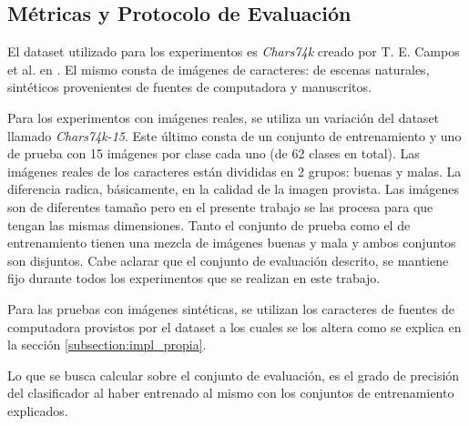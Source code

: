 \subsection{Métricas y Protocolo de Evaluación}
\label{subsection:evaluacion}


	El dataset utilizado para los experimentos es \textit{Chars74k} creado por T. E. Campos et al. en \cite{dCBV09}. El mismo consta de imágenes de caracteres: de escenas naturales, sintéticos provenientes de fuentes de computadora y manuscritos.
	
	Para los experimentos con imágenes reales, se utiliza un variación del dataset llamado \textit{Chars74k-15}. Este último consta de un conjunto de entrenamiento y uno de prueba con 15 imágenes por clase cada uno (de 62 clases en total). Las imágenes reales de los caracteres están divididas en 2 grupos: buenas y malas. La diferencia radica, básicamente, en la calidad de la imagen provista. Las imágenes son de diferentes tamaño pero en el presente trabajo se las procesa para que tengan las mismas dimensiones. Tanto el conjunto de prueba como el de entrenamiento tienen una mezcla de imágenes buenas y mala y ambos conjuntos son disjuntos. Cabe aclarar que el conjunto de evaluación descrito, se mantiene fijo durante todos los experimentos que se realizan en este trabajo.
	
	Para las pruebas con imágenes sintéticas, se utilizan los caracteres de fuentes de computadora provistos por el dataset a los cuales se los altera como se explica en la sección \ref{subsection:impl_propia}.
	
	Lo que se busca calcular sobre el conjunto de evaluación, es el grado de precisión del clasificador al haber entrenado al mismo con los conjuntos de entrenamiento explicados.